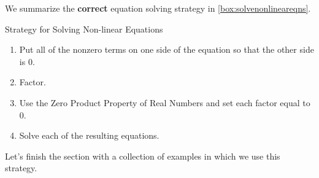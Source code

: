 We summarize the {\bf correct} equation solving strategy in \autoref{box:solvenonlineareqns}.

\begin{floatbox}[label=box:solvenonlineareqns]{Strategy for Solving Non-linear Equations}

\begin{enumerate}[leftmargin=*]

\item  Put all of the nonzero terms on one side of the equation so that the other side is $0$.
\item  Factor.
\item  Use the Zero Product Property of Real Numbers and set each factor equal to $0$.
\item  Solve each of the resulting equations.

\end{enumerate}

\end{floatbox}

Let's finish the section with a collection of examples in which we use this strategy.

